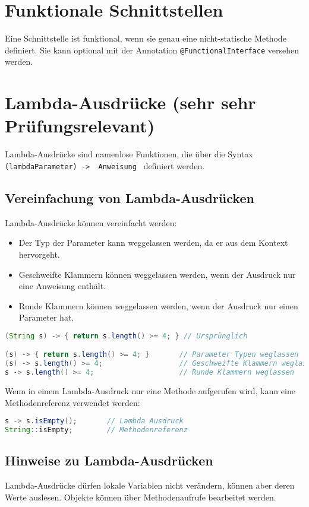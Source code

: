 \section{Funktionale Schnittstellen}
Eine Schnittstelle ist funktional, wenn sie genau eine nicht-statische Methode definiert. Sie kann optional mit der Annotation \texttt{@FunctionalInterface} versehen werden.

\section{Lambda-Ausdrücke (sehr sehr Prüfungsrelevant)}
Lambda-Ausdrücke sind namenlose Funktionen, die über die Syntax \texttt{(lambdaParameter) -> { Anweisung }} definiert werden.

\subsection{Vereinfachung von Lambda-Ausdrücken}
Lambda-Ausdrücke können vereinfacht werden:
\begin{itemize}
    \item Der Typ der Parameter kann weggelassen werden, da er aus dem Kontext hervorgeht.
    \item Geschweifte Klammern können weggelassen werden, wenn der Ausdruck nur eine Anweisung enthält.
    \item Runde Klammern können weggelassen werden, wenn der Ausdruck nur einen Parameter hat.
\end{itemize}
\begin{lstlisting}[language=Java, caption={Vereinfachung von Lambda ausdrücken}]
(String s) -> { return s.length() >= 4; } // Ursprünglich

(s) -> { return s.length() >= 4; }       // Parameter Typen weglassen
(s) -> s.length() >= 4;                  // Geschweifte Klammern weglassen
s -> s.length() >= 4;                    // Runde Klammern weglassen
\end{lstlisting}
Wenn in einem Lambda-Ausdruck nur eine Methode aufgerufen wird, kann eine Methodenreferenz verwendet werden:
\begin{lstlisting}[language=Java, caption={Methodenreferenz}]
s -> s.isEmpty();       // Lambda Ausdruck
String::isEmpty;        // Methodenreferenz
\end{lstlisting}

\subsection{Hinweise zu Lambda-Ausdrücken}
Lambda-Ausdrücke dürfen lokale Variablen nicht verändern, können aber deren Werte auslesen. Objekte können über Methodenaufrufe bearbeitet werden.